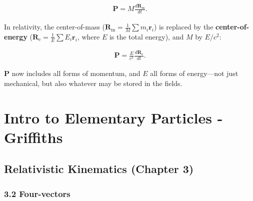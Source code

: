 \documentclass[11pt,letterpaper]{book}
\newcommand{\bm}[1]{\boldsymbol{#1}}
\begin{document}
        \begin{align}
        \bm{P} = M \frac{d\bm{R}_\text{m}}{dt}.
        \end{align}
        
        In relativity, the center-of-mass (\(\bm{R}_\text{m} = \frac{1}{M} \sum m_i \bm{r}_i\)) is replaced by the \textbf{center-of-energy} (\(\bm{R}_\text{e} = \frac{1}{E} \sum E_i \bm{r}_i\), where \(E\) is the total energy), and \(M\) by \(E/c^2\):
        
        \begin{align}
        \bm{P} = \frac{E}{c^2} \frac{d\bm{R}_\text{e}}{dt}.
        \end{align}
        
        \(\bm{P}\) now includes all forms of momentum, and \(E\) all forms of energy—not just mechanical, but also whatever may be stored in the fields.
        
\chapter{Intro to Elementary Particles - Griffiths}

    \section{Relativistic Kinematics (Chapter 3)}
        \subsection{3.2 Four-vectors}
\end{document}
